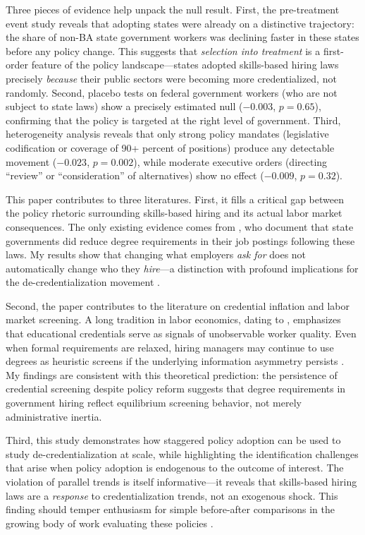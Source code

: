 \documentclass[12pt]{article}
\begin{document}
Three pieces of evidence help unpack the null result. First, the pre-treatment event study reveals that adopting states were already on a distinctive trajectory: the share of non-BA state government workers was declining faster in these states before any policy change. This suggests that \emph{selection into treatment} is a first-order feature of the policy landscape---states adopted skills-based hiring laws precisely \emph{because} their public sectors were becoming more credentialized, not randomly. Second, placebo tests on federal government workers (who are not subject to state laws) show a precisely estimated null ($-0.003$, $p = 0.65$), confirming that the policy is targeted at the right level of government. Third, heterogeneity analysis reveals that only strong policy mandates (legislative codification or coverage of 90+ percent of positions) produce any detectable movement ($-0.023$, $p = 0.002$), while moderate executive orders (directing ``review'' or ``consideration'' of alternatives) show no effect ($-0.009$, $p = 0.32$).

This paper contributes to three literatures. First, it fills a critical gap between the policy rhetoric surrounding skills-based hiring and its actual labor market consequences. The only existing evidence comes from \citet{Blair2024}, who document that state governments did reduce degree requirements in their job postings following these laws. My results show that changing what employers \emph{ask for} does not automatically change who they \emph{hire}---a distinction with profound implications for the de-credentialization movement \citep{Caplan2018, DegreeInflation2017}.

Second, the paper contributes to the literature on credential inflation and labor market screening. A long tradition in labor economics, dating to \citet{Spence1973}, emphasizes that educational credentials serve as signals of unobservable worker quality. Even when formal requirements are relaxed, hiring managers may continue to use degrees as heuristic screens if the underlying information asymmetry persists \citep{ArrowFilter1973, Stiglitz1975}. My findings are consistent with this theoretical prediction: the persistence of credential screening despite policy reform suggests that degree requirements in government hiring reflect equilibrium screening behavior, not merely administrative inertia.

Third, this study demonstrates how staggered policy adoption can be used to study de-credentialization at scale, while highlighting the identification challenges that arise when policy adoption is endogenous to the outcome of interest. The violation of parallel trends is itself informative---it reveals that skills-based hiring laws are a \emph{response} to credentialization trends, not an exogenous shock. This finding should temper enthusiasm for simple before-after comparisons in the growing body of work evaluating these policies \citep{Opportunity@Work2023}.
\end{document}
